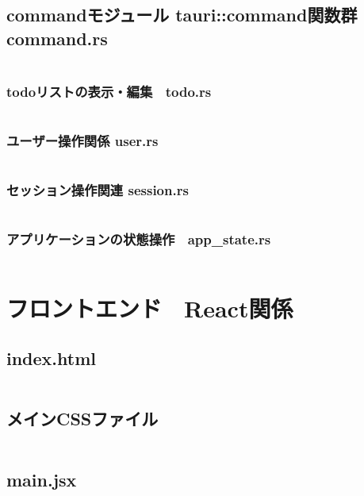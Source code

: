 \documentclass[paper=a4paper, fontsize=10pt, head_space=10mm, foot_space=17mm, gutter=17mm, line_length=185mm, twoside]{jlreq}
\begin{document}
\subsection{commandモジュール tauri::command関数群 command.rs}
\inputminted[linenos, breaklines]{rust}{src-rs/command.rs}
\clearpage

\subsubsection {todoリストの表示・編集　todo.rs}
\inputminted[linenos, breaklines]{rust}{src-rs/command/todo.rs}
\clearpage

\subsubsection {ユーザー操作関係 user.rs}
\inputminted[linenos, breaklines]{rust}{src-rs/command/user.rs}
\clearpage

\subsubsection {セッション操作関連 session.rs}
\inputminted[linenos, breaklines]{rust}{src-rs/command/session.rs}
\clearpage

\subsubsection {アプリケーションの状態操作　app\_state.rs}
\inputminted[linenos, breaklines]{rust}{src-rs/command/app_state.rs}
\clearpage

\section {フロントエンド　React関係}
\subsection {index.html}
\inputminted[linenos, breaklines]{html}{index.html}
\clearpage

\subsection {メインCSSファイル}
\inputminted[linenos, breaklines]{css}{src-react/App.css}
\clearpage

\subsection {main.jsx}
\inputminted[linenos, breaklines]{jsx}{src-react/main.jsx}
\clearpage
\end{document}
